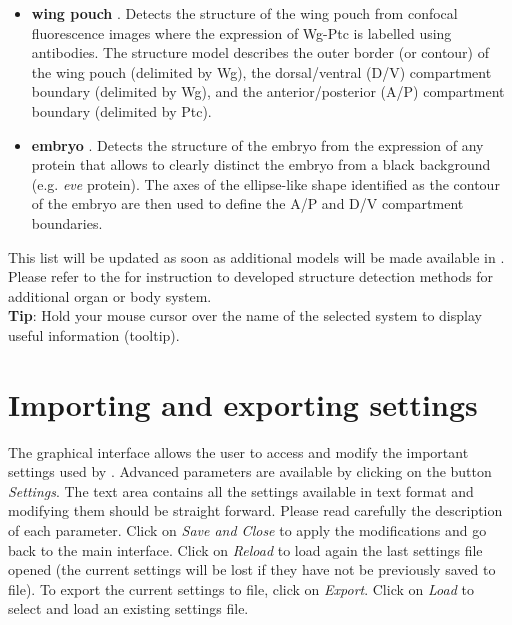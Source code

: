 \begin{itemize}
 \item \textbf{\droso wing pouch} \autocite{schaffter2013}. Detects the structure of the wing pouch from confocal fluorescence images where the expression of Wg-Ptc is labelled using antibodies. The structure model describes the outer border (or contour) of the wing pouch (delimited by Wg), the dorsal/ventral (D/V) compartment boundary (delimited by Wg), and the anterior/posterior (A/P) compartment boundary (delimited by Ptc).
 \item \textbf{\droso embryo} \autocite{schaffter2013}. Detects the structure of the embryo from the expression of any protein that allows to clearly distinct the embryo from a black background (e.g. \textit{eve} protein). The axes of the ellipse-like shape identified as the contour of the embryo are then used to define the A/P and D/V compartment boundaries.
\end{itemize}

This list will be updated as soon as additional models will be made available in \wingj. Please refer to the \wingjDeveloperGuide for instruction to developed structure detection methods for additional organ or body system.\\

\textbf{Tip}: Hold your mouse cursor over the name of the selected system to display useful information (tooltip).

\section{Importing and exporting settings}
The graphical interface allows the user to access and modify the important settings used by \wingj. Advanced parameters are available by clicking on the button \textit{Settings}. The text area contains all the settings available in text format and modifying them should be straight forward. Please read carefully the description of each parameter. Click on \textit{Save and Close} to apply the modifications and go back to the main interface. Click on \textit{Reload} to load again the last settings file opened (the current settings will be lost if they have not be previously saved to file). To export the current settings to file, click on \textit{Export}. Click on \textit{Load} to select and load an existing settings file.\\

